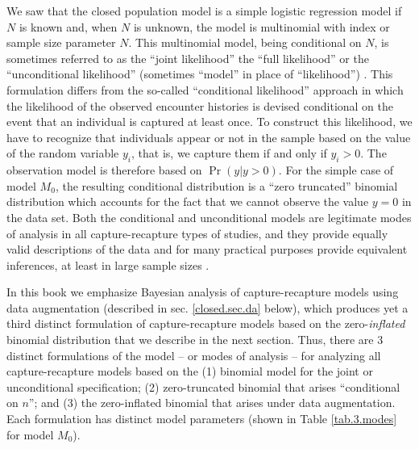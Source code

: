 We saw that the closed population model is a simple logistic
regression model if $N$ is known and, when $N$ is unknown, the model
is multinomial with index or sample size parameter $N$. This
multinomial model, being conditional on $N$, is sometimes referred to
as the ``joint likelihood'' the ``full likelihood'' or the
``unconditional likelihood'' (sometimes
``model'' in place of ``likelihood'')
\citep{sanathanan:1972,borchers_etal:2002}. This
formulation differs from the so-called ``conditional likelihood''
approach in which the likelihood of the observed encounter histories
is devised conditional on the event that an individual is captured at
least once.  To construct this likelihood, we have to recognize that
individuals appear or not in the sample based on the value of the
random variable $y_{i}$, that is, we capture them if and only if
$y_{i}>0$.  The observation model is therefore based on $\Pr(y|y>0)$.
For the simple case of model $M_0$, the resulting conditional
distribution is a ``zero truncated'' binomial distribution which
accounts for the fact that we cannot observe the value $y=0$ in the
data set. %
 Both the
conditional and unconditional models are legitimate modes of analysis
in all capture-recapture types of studies, and they provide equally
valid descriptions of the data and for many practical purposes provide
equivalent inferences, at least in large sample sizes
\citep{sanathanan:1972}.

In this book we emphasize Bayesian analysis of capture-recapture
models using data augmentation
(described in sec. \ref{closed.sec.da} below), which
produces yet a third distinct formulation of capture-recapture models
based on the zero-{\it inflated} binomial distribution that we
describe in the next section.  Thus, there are 3 distinct formulations
of the model -- or modes of analysis -- for analyzing all
capture-recapture models based on the (1) binomial model for the joint
or unconditional specification; (2) zero-truncated binomial that
arises ``conditional on $n$''; and (3) the zero-inflated binomial that
arises under data augmentation.  Each formulation has distinct
model parameters (shown in Table \ref{tab.3.modes} for
model $M_0$).


